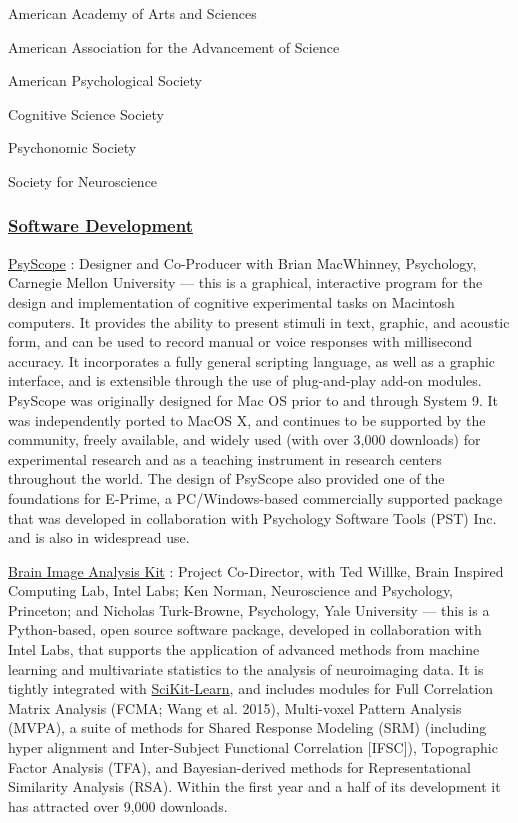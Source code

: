 \documentclass[10 pt]{article}
\begin{document}
American Academy of Arts and Sciences

American Association for the Advancement of Science

American Psychological Society

Cognitive Science Society

Psychonomic Society

Society for Neuroscience


\subsubsection*{\underline{Software Development}} \label{secSD}
    \smallskip

\href{https://en.wikipedia.org/wiki/PsyScope}{PsyScope} \cite{cohen1993psyscope}: Designer and Co-Producer with Brian MacWhinney, Psychology, Carnegie Mellon University — this is a graphical, interactive program for the design and implementation of cognitive experimental tasks on Macintosh computers. It provides the ability to present stimuli in text, graphic, and acoustic form, and can be used to record manual or voice responses with millisecond accuracy. It incorporates a fully general scripting language, as well as a graphic interface, and is extensible through the use of plug-and-play add-on modules. PsyScope was originally designed for Mac OS prior to and through System 9. It was independently ported to MacOS X, and continues to be supported by the community, freely available, and widely used (with over 3,000 downloads) for experimental research and as a teaching instrument in research centers throughout the world. The design of PsyScope also provided one of the foundations for E-Prime, a PC/Windows-based commercially supported package that was developed in collaboration with Psychology Software Tools (PST) Inc. and is also in
widespread use.
    \smallskip

\href{http://BrainIAK.org}{Brain Image Analysis Kit} \cite{kumar2021brainiak}: Project Co-Director, with Ted Willke, Brain Inspired Computing Lab, Intel Labs; Ken Norman, Neuroscience and Psychology, Princeton; and Nicholas Turk-Browne, Psychology, Yale University — this is a Python-based, open source software package, developed in collaboration with Intel Labs, that supports the application of advanced methods from machine learning and multivariate statistics to the analysis of neuroimaging data. It is tightly integrated with \href{http://scikit-learn.org/}{SciKit-Learn}, and includes modules for Full Correlation Matrix Analysis (FCMA; Wang et al. 2015), Multi-voxel Pattern Analysis (MVPA), a suite of methods for Shared Response Modeling (SRM) (including hyper alignment and Inter-Subject Functional Correlation [IFSC]), Topographic Factor Analysis (TFA), and Bayesian-derived methods for Representational Similarity Analysis (RSA). Within the first year and a half of its development it has attracted over 9,000 downloads.
    \smallskip
\end{document}
